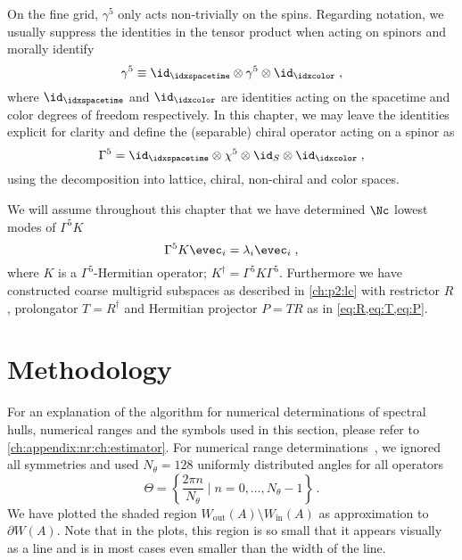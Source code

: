 On the fine grid, $\gamma^5$ only acts non-trivially on the spins.
Regarding notation, we usually suppress the identities in the tensor product when acting on spinors and morally identify
\begin{equation}
\gamma^5 \equiv \id_{\idxspacetime} \otimes \gamma^5 \otimes \id_{\idxcolor} \;,
\end{equation}
where $\id_{\idxspacetime}$ and $\id_{\idxcolor}$ are identities acting on the spacetime and color degrees of freedom respectively.
In this chapter, we may leave the identities explicit for clarity and define the (separable) chiral operator acting on a spinor as
\begin{equation}
\Gamma^5 = \id_{\idxspacetime} \otimes \chi^5 \otimes \id_S \otimes \id_{\idxcolor} \;,
\end{equation}
using the decomposition into lattice, chiral, non-chiral and color spaces.

We will assume throughout this chapter that we have determined $\Nc$ lowest modes of $\Gamma^{5} K$
\begin{equation} \label{eq:fine:low:modes}
\Gamma^5 K \evec_i = \lambda_i \evec_i \;,
\end{equation}
where $K$ is a $\Gamma^{5}$-Hermitian operator; $K^{\dagger} = \Gamma^{5} K \Gamma^{5}$.
Furthermore we have constructed coarse multigrid subspaces as described in \cref{ch:p2:lc} with restrictor $R$, prolongator $T=R^{\dagger}$ and Hermitian projector $P = TR$ as in \cref{eq:R,eq:T,eq:P}.

\section{Methodology}

For an explanation of the algorithm for numerical determinations of spectral hulls, numerical ranges and the symbols used in this section, please refer to \cref{ch:appendix:nr:ch:estimator}.
For numerical range determinations~\cite{johnson1978numerical}, we ignored all symmetries and used $N_{\theta}=128$ uniformly distributed angles for all operators
\begin{equation}
\Theta = \left\{ \frac{2 \pi n}{N_{\theta}} \mid n = 0, \ldots, N_{\theta}-1 \right\} \,.
\end{equation}
We have plotted the shaded region $W_{\text{out}}(A) \setminus W_{\text{in}}(A)$ as approximation to $\partial W(A)$.
Note that in the plots, this region is so small that it appears visually as a line and is in most cases even smaller than the width of the line.

